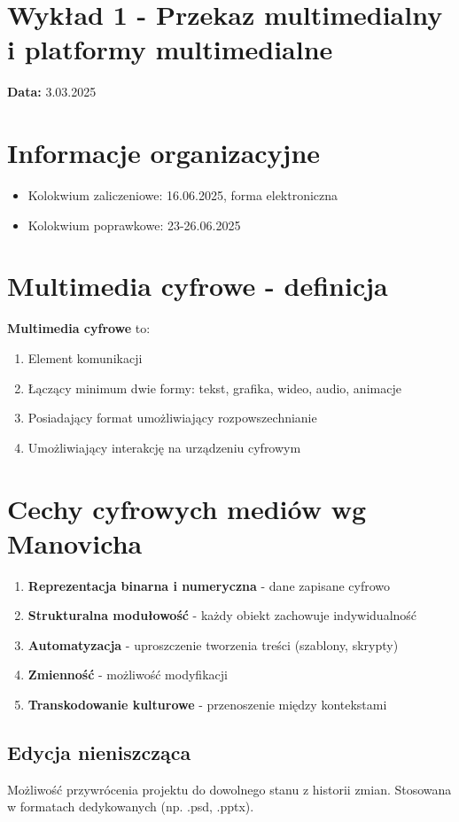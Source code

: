 \section*{Wykład 1 - Przekaz multimedialny i platformy multimedialne}
\textbf{Data:} 3.03.2025

\section{Informacje organizacyjne}
\begin{itemize}[noitemsep]
    \item Kolokwium zaliczeniowe: 16.06.2025, forma elektroniczna
    \item Kolokwium poprawkowe: 23-26.06.2025
\end{itemize}

\section{Multimedia cyfrowe - definicja}
\textbf{Multimedia cyfrowe} to:
\begin{enumerate}[noitemsep]
    \item Element komunikacji
    \item Łączący minimum dwie formy: tekst, grafika, wideo, audio, animacje
    \item Posiadający format umożliwiający rozpowszechnianie
    \item Umożliwiający interakcję na urządzeniu cyfrowym
\end{enumerate}

\section{Cechy cyfrowych mediów wg Manovicha}
\begin{enumerate}[noitemsep]
    \item \textbf{Reprezentacja binarna i numeryczna} - dane zapisane cyfrowo
    \item \textbf{Strukturalna modułowość} - każdy obiekt zachowuje indywidualność
    \item \textbf{Automatyzacja} - uproszczenie tworzenia treści (szablony, skrypty)
    \item \textbf{Zmienność} - możliwość modyfikacji
    \item \textbf{Transkodowanie kulturowe} - przenoszenie między kontekstami
\end{enumerate}

\subsection{Edycja nieniszcząca}
Możliwość przywrócenia projektu do dowolnego stanu z historii zmian. Stosowana w formatach dedykowanych (np. .psd, .pptx).

